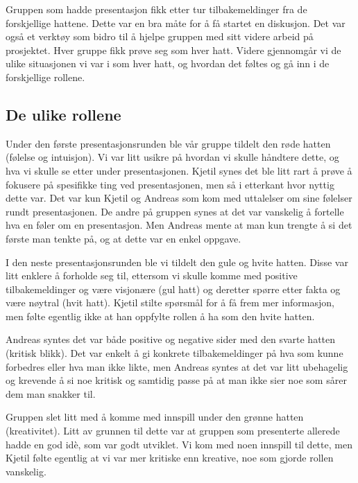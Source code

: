 		
Gruppen som hadde presentasjon fikk etter tur tilbakemeldinger fra de forskjellige hattene. Dette var en bra måte for å få startet en diskusjon. Det var også et verktøy som bidro til å hjelpe gruppen med sitt videre arbeid på prosjektet. Hver gruppe fikk prøve seg som hver hatt. Videre gjennomgår vi de ulike situasjonen vi var i som hver hatt, og hvordan det føltes og gå inn i de forskjellige rollene.

\subsection{De ulike rollene}
Under den første presentasjonsrunden ble vår gruppe tildelt den røde hatten (følelse og intuisjon). Vi var litt usikre på hvordan vi skulle håndtere dette, og hva vi skulle se etter under presentasjonen. Kjetil synes det ble litt rart å prøve å fokusere på spesifikke ting ved presentasjonen, men så i etterkant hvor nyttig dette var. Det var  kun Kjetil og Andreas som kom med uttalelser om sine følelser rundt presentasjonen. De andre på gruppen synes at det var vanskelig å fortelle hva en føler om en presentasjon. Men Andreas mente at man kun trengte å si det første man tenkte på, og at dette var en enkel oppgave. 

I den neste presentasjonsrunden ble vi tildelt den gule og hvite hatten. Disse var litt enklere å forholde seg til, ettersom vi skulle komme med positive tilbakemeldinger og være visjonære (gul hatt) og deretter spørre etter fakta og være nøytral (hvit hatt). Kjetil stilte spørsmål for å få frem mer informasjon, men følte egentlig ikke at han oppfylte rollen å ha som den hvite hatten.

Andreas syntes det var både positive og negative sider med den svarte hatten (kritisk blikk). Det var enkelt å gi konkrete tilbakemeldinger på hva som kunne forbedres eller hva man ikke likte, men Andreas syntes at det var litt ubehagelig og krevende å si noe kritisk og samtidig passe på at man ikke sier noe som sårer dem man snakker til.

Gruppen slet litt med å komme med innspill under den grønne hatten (kreativitet). Litt av grunnen til dette var at gruppen som presenterte allerede hadde en god idè, som var godt utviklet. Vi kom med noen innspill til dette, men Kjetil følte egentlig at vi var mer kritiske enn kreative, noe som gjorde rollen vanskelig.


